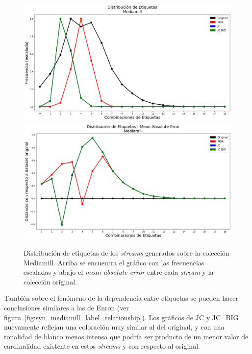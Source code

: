 \begin{figure}[htbp]
	\includegraphics[width=\linewidth]{figures/experiments/syn/mediamill/label_distribution.png}
	\includegraphics[width=\linewidth]{figures/experiments/syn/mediamill/ld_mae.png}
	\caption[Distribución de etiquetas de los \textit{streams} generados sobre la colección
		Mediamill.]{Distribución de etiquetas de los \textit{streams} generados sobre la colección
		Mediamill. Arriba se encuentra el gráfico con las frecuencias escaladas y
		abajo el \textit{mean absolute error} entre cada \textit{stream} y la
		colección original.}
	\label{fig:syn_mediamill_label_distribution}
\end{figure}

También sobre el fenómeno de la dependencia entre etiquetas se pueden hacer
conclusiones similares a las de Enron (ver
figura~\ref{fig:syn_mediamill_label_relationship}). Los gráficos de JC y JC\_BIG
nuevamente reflejan una coloración muy similar al del original, y con una
tonalidad de blanco menos intensa que podría ser producto de un menor valor de
cardinalidad existente en estos \textit{streams} y con respecto al original.

